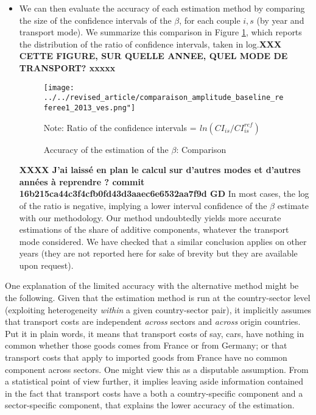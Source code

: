 \documentclass[a4paper,11pt]{article}
\begin{document}
\begin{itemize}
\begin{itemize}
    \item We can then evaluate the accuracy of each estimation method by comparing the size of the confidence intervals of the $\beta$, for each couple $i,s$ (by year and transport mode). We summarize this comparison in Figure \ref{fig:accuracy_beta}, which reports the distribution of the ratio of confidence intervals, taken in log.\textbf{XXX CETTE FIGURE, SUR QUELLE ANNEE, QUEL MODE DE TRANSPORT? xxxxx}


    \begin{figure}[htbp]
    \caption{Accuracy of the estimation of the $\beta$: Comparison}
    \label{fig:accuracy_beta}
    \begin{center}
    \texttt{[image: ../../revised\_article/comparaison\_amplitude\_baseline\_referee1\_2013\_ves.png"]}
    \begin{minipage} [c]  {5in} \scriptsize%
    	    Note: Ratio of the confidence intervals = $ _{}ln(CI_{is}/CI^{ref}_{is})$
    \end{minipage}

    \end{center}
    \end{figure}

   \textbf{XXXX J’ai laissé en plan le calcul sur d’autres modes et d’autres années à reprendre ? commit 16b215ca44c3f4cfb0fd43d3aaec6e6532aa7f9d  GD} In most cases, the log of the ratio is negative, implying a lower interval confidence of the $\beta$ estimate with our methodology. Our method undoubtedly yields more accurate estimations of the share of additive components, whatever the transport mode considered. We have checked that a similar conclusion applies on other years (they are not reported here for sake of brevity but they are available upon request).
    \end{itemize}

One explanation of the limited accuracy with the alternative method might be the following. Given that the estimation method is run at the country-sector level (exploiting heterogeneity \textit{within} a given country-sector pair), it implicitly assumes that transport costs are independent \textit{across} sectors and \textit{across} origin countries. Put it in plain words, it means that transport costs of say, cars, have nothing in common whether those goods comes from France or from Germany; or that transport costs that apply to imported goods from France have no common component across sectors. One might view this as a disputable assumption. From a statistical point of view further, it implies leaving aside information contained in the fact that transport costs have a both a country-specific component and a sector-specific component, that explains the lower accuracy of the estimation.


\end{itemize}
\end{document}
